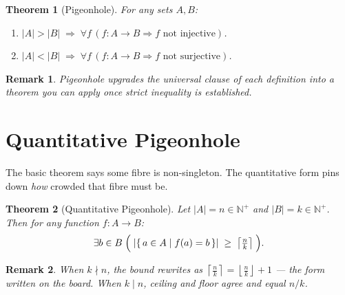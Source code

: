 \documentclass[11pt]{article}
\theoremstyle{defstyle}
\theoremstyle{thmstyle}
\newtheorem{theorem}{Theorem}[section]
\theoremstyle{notstyle}
\newtheorem*{remark}{Remark}
\theoremstyle{cautionstyle}
\newcommand{\card}[1]{\lvert #1 \rvert}
\newcommand{\Npos}{\mathbb{N}^+}
\begin{document}
\begin{thmbox}
\begin{theorem}[Pigeonhole]
For any sets $A, B$:
\begin{enumerate}[label=\textnormal{(\roman*)}, leftmargin=2em, itemsep=2pt]
  \item $\card{A} > \card{B} \;\Rightarrow\; \forall f\,(f : A \to B \Rightarrow f \text{ not injective})$.
  \item $\card{A} < \card{B} \;\Rightarrow\; \forall f\,(f : A \to B \Rightarrow f \text{ not surjective})$.
\end{enumerate}
\end{theorem}
\end{thmbox}

\begin{notebox}
\begin{remark}
Pigeonhole upgrades the universal clause of each definition into a theorem you
can apply once strict inequality is established.
\end{remark}
\end{notebox}

\section{Quantitative Pigeonhole}

The basic theorem says some fibre is non-singleton. The quantitative form pins
down \emph{how} crowded that fibre must be.

\begin{thmbox}
\begin{theorem}[Quantitative Pigeonhole]
Let $\card{A} = n \in \Npos$ and $\card{B} = k \in \Npos$. Then for any
function $f : A \to B$:
\[
  \exists b \in B \;\Bigl(\;\card{\{\,a \in A \mid f(a) = b\,\}} \;\geq\; \left\lceil \tfrac{n}{k} \right\rceil\;\Bigr).
\]
\end{theorem}
\end{thmbox}

\begin{notebox}
\begin{remark}
When $k \nmid n$, the bound rewrites as $\left\lceil \tfrac{n}{k} \right\rceil = \left\lfloor \tfrac{n}{k} \right\rfloor + 1$
--- the form written on the board. When $k \mid n$, ceiling and floor agree
and equal $n/k$.
\end{remark}
\end{notebox}
\end{document}
